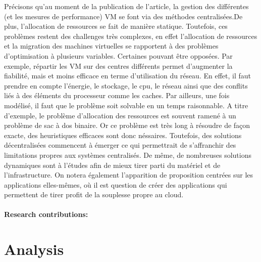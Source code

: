 \documentclass[11pt]{article}
\begin{document}
Précisons qu'au moment de la publication de l'article, la gestion des différentes (et les mesures de performance) VM se font via des méthodes
centralisées.De plus, l'allocation de ressources se fait de 
manière statique. Toutefois, ces problèmes restent des challenges très complexes, en effet l'allocation de ressources et la migration des machines virtuelles se rapportent
à des problèmes d'optimisation à plusieurs variables. Certaines pouvant être opposées. Par exemple, répartir les VM sur des centres différents permet d'augmenter la
fiabilité, mais et moins efficace en terme d'utilisation du réseau.
En effet, il faut prendre en compte l'énergie, le stockage, le cpu, le réseau 
ainsi que des conflits liés à des éléments du processeur comme les caches. Par ailleurs, une fois modélisé, il faut que le problème soit solvable en un temps raisonnable.
A titre d'exemple, le problème d'allocation des ressources est souvent ramené à un problème de sac à dos binaire. Or ce problème est très long à résoudre de façon exacte, 
des heuristiques efficaces sont donc néssaires. Toutefois, des solutions décentralisées commencent à émerger ce qui permettrait de s'affranchir des limitations propres
aux systèmes centralisés. De même, de nombreuses solutions dynamiques sont à l'études afin de mieux tirer parti du matériel et de l'infrastructure.
On notera également l'apparition de proposition centrées sur les applications elles-mêmes, où il est question de créer des applications qui permettent de tirer profit de 
la souplesse propre au cloud.



\paragraph{Research contributions:}

\section{Analysis}
\end{document}
